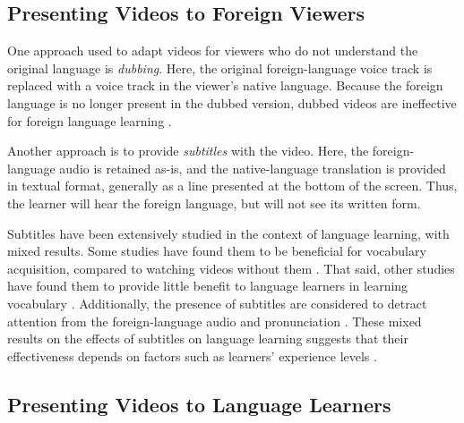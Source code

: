 \documentclass{sigchi}
\begin{document}
\subsection{Presenting Videos to Foreign Viewers}

One approach used to adapt videos for viewers who do not understand the original language is \emph{dubbing}. Here, the original foreign-language voice track is replaced with a voice track in the viewer's native language.
Because the foreign language is no longer present in the dubbed version, dubbed videos are ineffective for foreign language learning \cite{dubbing}.

Another approach is to provide \emph{subtitles} with the video. Here, the foreign-language audio is retained as-is, and the native-language translation is provided in textual format, generally as a line presented at the bottom of the screen.
Thus, the learner will hear the foreign language, but will not see its written form.

Subtitles have been extensively studied in the context of language learning,
with mixed results.
Some studies have found them to be beneficial for vocabulary acquisition, compared to watching videos without them \cite{danan2004captioning}.
That said, other studies have found them to provide little benefit to language learners in learning vocabulary \cite{danan1992reversed}. Additionally, the presence of subtitles are considered to detract attention from the foreign-language audio and pronunciation \cite{mitterer2009foreign}.
These mixed results on the effects of subtitles on language learning suggests that their effectiveness depends on factors such as learners' experience levels \cite{bianchi2008captions}.

\subsection{Presenting Videos to Language Learners}

\end{document}
